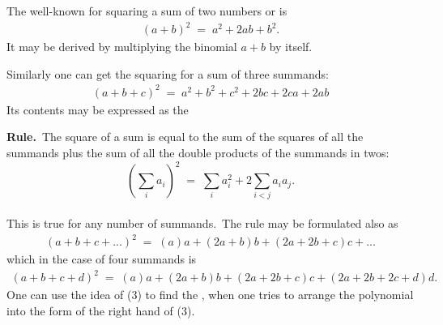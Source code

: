 \documentclass[12pt]{article}
\theoremstyle{definition}
\begin{document}
The well-known  for squaring a sum of two numbers or  is
\begin{align}
(a\!+\!b)^2 \;=\; a^2\!+\!2ab\!+\!b^2.
\end{align}
It may be derived by multiplying the binomial $a\!+\!b$ by itself.

Similarly one can get the squaring  for a sum of three summands:
\begin{align}
(a\!+\!b\!+\!c)^2 \;=\; a^2\!+\!b^2\!+\!c^2\!+\!2bc\!+\!2ca\!+\!2ab
\end{align}
Its contents may be expressed as the

\textbf{Rule.}\, The square of a sum is equal to the sum of the squares of all the summands plus the sum of all the double products of the summands in twos:
$$\left(\sum_ia_i\right)^2 \;=\; \sum_ia_i^2+2\!\sum_{i<j}a_ia_j.$$\\

This is true for any number of summands.\, The rule may be formulated also as
\begin{align}
(a\!+\!b\!+\!c+...)^2 \;=\;
 (a)a+(2a\!+\!b)b+(2a\!+\!2b\!+\!c)c+...
\end{align}
which in the case of four summands is
\begin{align}
(a\!+\!b\!+\!c\!+\!d)^2 \;=\;
 (a)a+(2a\!+\!b)b+(2a\!+\!2b\!+\!c)c+(2a\!+\!2b\!+\!2c\!+\!d)d.
\end{align}
One can use the idea of (3) to find the , when one tries to arrange the polynomial into the form of the right hand  of (3).
\end{document}
